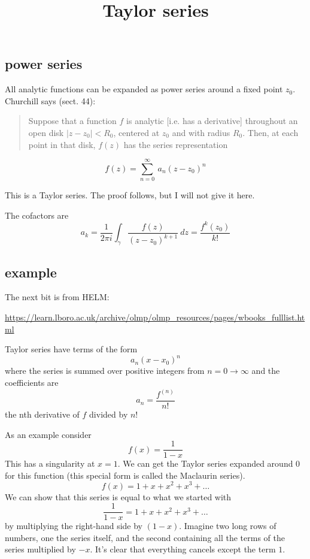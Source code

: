 \documentclass[11pt, oneside]{article}
\title{Taylor series}
\date{}
\begin{document}
\maketitle
\Large


\subsection*{power series}

All analytic functions can be expanded as power series around a fixed point $z_0$.  Churchill says (sect. 44):

\begin{quote}Suppose that a function $f$ is analytic [i.e. has a derivative] throughout an open disk $|z - z_0| < R_0$, centered at $z_0$ and with radius $R_0$.  Then, at each point in that disk, $f(z)$ has the series representation\end{quote}

\[ f(z) = \sum_{n=0}^{\infty} \ a_n(z - z_0)^n \]

This is a Taylor series.  The proof follows, but I will not give it here.

The cofactors are
\[ a_k = \frac{1}{2 \pi i} \int_{\gamma} \frac{f(z)}{(z - z_0)^{k+1}} \ dz = \frac{f^k (z_0)}{k!} \]

\subsection*{example}

The next bit is from HELM:

\url{https://learn.lboro.ac.uk/archive/olmp/olmp_resources/pages/wbooks_fulllist.html}

Taylor series have terms of the form
\[ a_n (x-x_0)^n \] 
where the series is summed over positive integers from $n = 0 \rightarrow \infty$ and the coefficients are
\[ a_n = \frac{f^{(n)}}{n!} \]
the nth derivative of $f$ divided by $n!$

As an example consider
\[ f(x) = \frac{1}{1 - x} \]
This has a singularity at $x = 1$.  We can get the Taylor series expanded around $0$ for this function (this special form is called the Maclaurin series).
\[ f(x) = 1 + x + x^2 + x^3 + \dots \]
We can show that this series is equal to what we started with
\[ \frac{1}{1 - x} = 1 + x + x^2 + x^3 + \dots \]
by multiplying the right-hand side by $(1-x)$.  Imagine two long rows of numbers, one the series itself, and the second containing all the terms of the series multiplied by $-x$.  It's clear that everything cancels except the term $1$.
\end{document}
